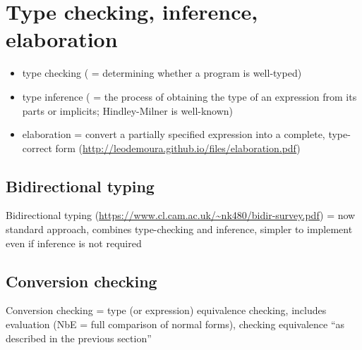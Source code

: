 \documentclass[english,zadani,odsaz]{fitthesis}
\begin{document}



\section{Type checking, inference, elaboration}
\label{sec:orgfe512bf}
\begin{itemize}
\item type checking ( = determining whether a program is well-typed)
\item type inference ( = the process of obtaining the type of an expression from its
parts or implicits; Hindley-Milner is well-known)
\item elaboration = convert a partially specified expression into a complete,
type-correct form (\url{http://leodemoura.github.io/files/elaboration.pdf})
\end{itemize}


\subsection{Bidirectional typing}
\label{sec:orgd0472ca}
Bidirectional typing (\url{https://www.cl.cam.ac.uk/\~nk480/bidir-survey.pdf}) = now
standard approach, combines type-checking and inference, simpler to implement
even if inference is not required



\subsection{Conversion checking}
\label{sec:orgcf45819}
Conversion checking = type (or expression) equivalence checking, includes
evaluation (NbE = full comparison of normal forms), checking equivalence ``as
described in the previous section''

\end{document}
